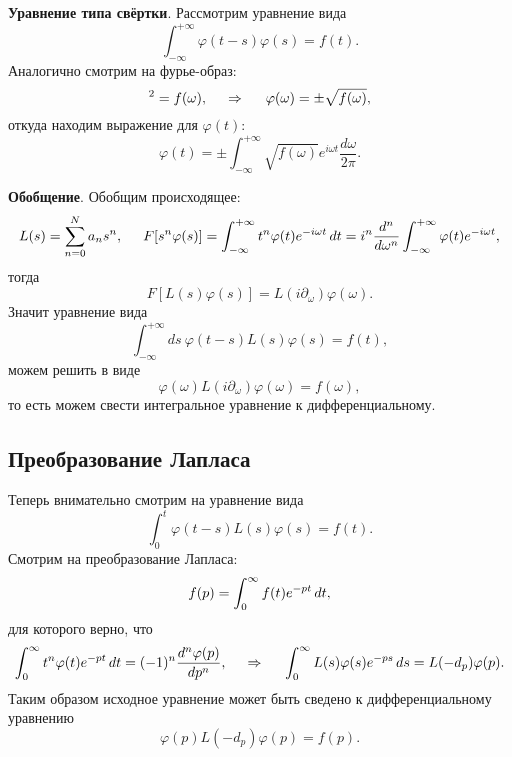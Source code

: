 \textbf{Уравнение типа свёртки}. Рассмотрим уравнение вида
\begin{equation*}
	\int_{-\infty}^{+\infty} \varphi(t-s) \varphi(s) = f(t).
\end{equation*}
Аналогично смотрим на фурье-образ:
\begin{equation*}
	[\varphi(\omega)]^2 = f(\omega),
	\hspace{0.5cm} \Rightarrow \hspace{0.5cm}
	\varphi(\omega) = \pm \sqrt{f(\omega)},
\end{equation*}
откуда находим выражение для $\varphi(t)$:
\begin{equation*}
	\varphi(t) = \pm \int_{-\infty}^{+\infty} \sqrt{f(\omega)} e^{i \omega t} \frac{d \omega}{2\pi}.
\end{equation*}


\textbf{Обобщение}. 
Обобщим происходящее:
\begin{equation*}
	L(s) = \sum_{n=0}^{N} a_n s^n,
	\hspace{5 mm} 
	F[s^n \varphi(s)] = \int_{-\infty}^{+\infty} t^n \varphi(t) e^{-i \omega t} \, d t = i^n \frac{d^n }{d \omega^n}  \int_{-\infty}^{+\infty} \varphi(t) e^{-i \omega t},
\end{equation*}
тогда 
\begin{equation*}
	F[L(s) \varphi(s)] = L(i \partial_\omega) \varphi(\omega).
\end{equation*}
Значит уравнение вида
\begin{equation*}
	\int_{-\infty}^{+\infty} ds\ \varphi(t-s) L(s) \varphi(s) = f(t),
\end{equation*}
можем решить в виде
\begin{equation*}
	\varphi(\omega) L(i \partial_\omega) \varphi(\omega) = f(\omega),
\end{equation*}
то есть можем свести интегральное уравнение к дифференциальному.



 
\subsection*{Преобразование Лапласа}
	
Теперь внимательно смотрим на уравнение вида
\begin{equation*}
	\int_{0}^{t} \varphi(t-s) L(s) \varphi(s) = f(t).
\end{equation*}
Смотрим на преобразование Лапласа:
\begin{equation*}
	f(p) = \int_{0}^{\infty} f(t) e^{-pt} \, d t,
\end{equation*}
для которого верно, что
\begin{equation*}
	\int_{0}^{\infty} t^n \varphi(t) e^{-pt} \, d t = 
	(-1)^n \frac{d^n \varphi(p)}{d p^n},
	\hspace{0.5cm} \Rightarrow \hspace{0.5cm}
	\int_{0}^{\infty} L(s) \varphi(s) e^{-ps} \, d s = L(-d_p) \varphi(p).
\end{equation*}
Таким образом исходное уравнение может быть сведено к дифференциальному уравнению
\begin{equation*}
	\varphi(p) L(- d_p) \varphi(p) = f(p).
\end{equation*}

